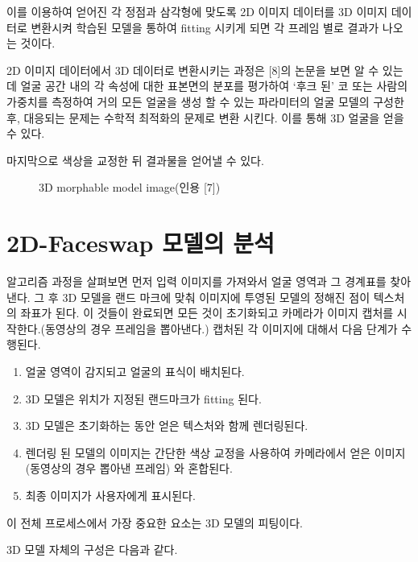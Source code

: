 \documentclass{oblivoir}
\begin{document}
이를 이용하여 얻어진 각 정점과 삼각형에 맞도록 2D 이미지 데이터를 3D 이미지 데이터로 변환시켜 학습된 모델을 통하여 fitting 시키게 되면 각 프레임 별로 결과가 나오는 것이다.

2D 이미지 데이터에서 3D 데이터로 변환시키는 과정은 [8]의 논문을 보면 알 수 있는데 
얼굴 공간 내의 각 속성에 대한 표본면의 분포를 평가하여 ‘후크 된’ 코 또는 사람의 가중치를 측정하여 거의 모든 얼굴을 생성 할 수 있는 파라미터의 얼굴 모델의 구성한 후, 대응되는 문제는 수학적 최적화의 문제로 변환 시킨다. 이를 통해 3D 얼굴을 얻을 수 있다.

마지막으로 색상을 교정한 뒤 결과물을 얻어낼 수 있다.

\begin{figure}[h!]
\centering
\caption{ 3D morphable model image(인용 [7])}
\end{figure}


\section{2D-Faceswap 모델의 분석}

알고리즘 과정을 살펴보면 먼저 입력 이미지를 가져와서 얼굴 영역과 그 경계표를 찾아낸다. 그 후 3D 모델을 랜드 마크에 맞춰 이미지에 투영된 모델의 정해진 점이 텍스처의 좌표가 된다. 이 것들이 완료되면 모든 것이 초기화되고 카메라가 이미지 캡처를 시작한다.(동영상의 경우 프레임을 뽑아낸다.) 캡처된 각 이미지에 대해서 다음 단계가 수행된다.

\begin{enumerate}
    \item 얼굴 영역이 감지되고 얼굴의 표식이 배치된다.
    \item 3D 모델은 위치가 지정된 랜드마크가 fitting 된다.
    \item 3D 모델은 초기화하는 동안 얻은 텍스처와 함께 렌더링된다.
    \item 렌더링 된 모델의 이미지는 간단한 색상 교정을 사용하여 카메라에서 얻은 이미지(동영상의 경우 뽑아낸 프레임) 와 혼합된다.
    \item 최종 이미지가 사용자에게 표시된다.
\end{enumerate}

이 전체 프로세스에서 가장 중요한 요소는 3D 모델의 피팅이다. 

3D 모델 자체의 구성은 다음과 같다.
\end{document}
